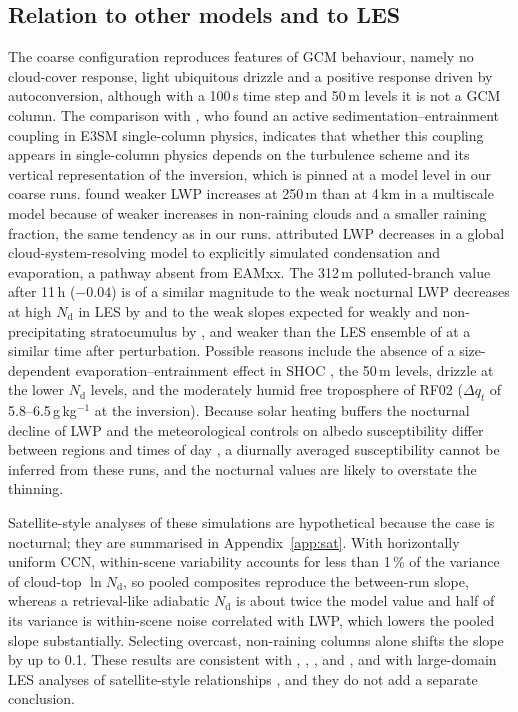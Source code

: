 \documentclass[acp, manuscript]{copernicus}
\newcommand{\Nd}{N_\mathrm{d}}
\begin{document}
\subsection{Relation to other models and to LES}

The coarse configuration reproduces features of GCM behaviour, namely no cloud-cover response, light ubiquitous drizzle and a positive response driven by autoconversion, although with a 100\,s time step and 50\,m levels it is not a GCM column. The comparison with \citet{mulmenstadt2024adj}, who found an active sedimentation--entrainment coupling in E3SM single-column physics, indicates that whether this coupling appears in single-column physics depends on the turbulence scheme and its vertical representation of the inversion, which is pinned at a model level in our coarse runs. \citet{terai2020} found weaker LWP increases at 250\,m than at 4\,km in a multiscale model because of weaker increases in non-raining clouds and a smaller raining fraction, the same tendency as in our runs. \citet{sato2018} attributed LWP decreases in a global cloud-system-resolving model to explicitly simulated condensation and evaporation, a pathway absent from EAMxx. The 312\,m polluted-branch value after 11\,h ($-0.04$) is of a similar magnitude to the weak nocturnal LWP decreases at high $\Nd$ in LES by \citet{hill2009} and to the weak slopes expected for weakly and non-precipitating stratocumulus by \citet{hoffmann2025}, and weaker than the LES ensemble of \citet{chen2025} at a similar time after perturbation. Possible reasons include the absence of a size-dependent evaporation--entrainment effect in SHOC \citep{wang2003,hoffmann2019}, the 50\,m levels, drizzle at the lower $\Nd$ levels, and the moderately humid free troposphere of RF02 ($\Delta q_t$ of 5.8--6.5\,g\,kg$^{-1}$ at the inversion). Because solar heating buffers the nocturnal decline of LWP \citep{zhang2024,chen2024,sandu2008} and the meteorological controls on albedo susceptibility differ between regions and times of day \citep{zhang2019,zhang2023}, a diurnally averaged susceptibility cannot be inferred from these runs, and the nocturnal values are likely to overstate the thinning.

Satellite-style analyses of these simulations are hypothetical because the case is nocturnal; they are summarised in Appendix~\ref{app:sat}. With horizontally uniform CCN, within-scene variability accounts for less than 1\,\% of the variance of cloud-top $\ln\Nd$, so pooled composites reproduce the between-run slope, whereas a retrieval-like adiabatic $\Nd$ is about twice the model value and half of its variance is within-scene noise correlated with LWP, which lowers the pooled slope substantially. Selecting overcast, non-raining columns alone shifts the slope by up to 0.1. These results are consistent with \citet{gryspeerdt2019}, \citet{quaas2020}, \citet{arola2022}, \citet{gryspeerdt2022amt} and \citet{kokkola2025}, and with large-domain LES analyses of satellite-style relationships \citep{costasuros2020,dipu2022}, and they do not add a separate conclusion.
\end{document}
